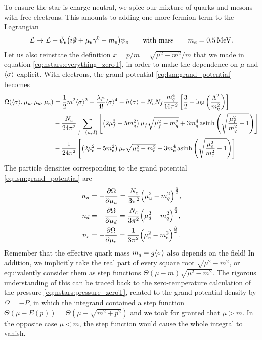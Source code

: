 To ensure the star is charge neutral, we spice our mixture of quarks and mesons with free electrons.
This amounts to adding one more fermion term to the Lagrangian
\begin{equation}
	\mathcal{L} \rightarrow \mathcal{L} + \bar{\psi}_e \big( i \slashed\partial + \mu_e \gamma^0 - m_e \big) \psi_e
	\qquad \text{with mass} \qquad
	m_e = \SI{0.5}{\mega\electronvolt}.
\end{equation}
Let us also reinstate the definition $x = p / m = \sqrt{\mu^2-m^2} / m$ that we made in equation \eqref{eq:nstars:everything_zeroT}, in order to make the dependence on $\mu$ and $\langle \sigma \rangle$ explicit.
With electrons, the grand potential \eqref{eq:lsm:grand_potential} becomes
\begin{equation}
\begin{split}
	\Omega(\langle \sigma \rangle,\mu_u,\mu_d,\mu_e) &= \frac12 m^2 \langle \sigma \rangle^2 + \frac{\lambda_P}{4!} \langle \sigma \rangle^4 - h \langle \sigma \rangle + N_c N_f \frac{m_q^4}{16 \pi^2} \left[ \frac{3}{2} + \log\left(\frac{{\Lambda}^2}{m_q^2}\right) \right] \\
	                                       &- \frac{N_c}{24 \pi^2} \sum_{f=\{u,d\}} \left[ \left( 2 \mu_f^2 - 5 m_q^2 \right) \mu_f \sqrt{\mu_f^2 - m_q^2} + 3 m_q^4 \operatorname{asinh} \left( \sqrt{\frac{\mu_{\smash{f}}^2}{m_q^2}-1} \right) \right] \\
	                                       &- \frac{  1}{24 \pi^2} \left[ \left( 2 \mu_e^2 - 5 m_e^2 \right) \mu_e \sqrt{\mu_e^2 - m_e^2} + 3 m_e^4 \operatorname{asinh} \left( \sqrt{\frac{\mu_e^2}{m_e^2}-1} \right) \right] .
\end{split}
\label{eq:lsm:grand_potential}
\end{equation}
The particle densities corresponding to the grand potential \eqref{eq:lsm:grand_potential} are
\begin{subequations}
\begin{align}
	n_u &= -\pdv{\Omega}{\mu_u} = \frac{N_c}{3 \pi^2} \Big( \mu_u^2 - m_q^2 \Big)^{\frac32}, \\
	n_d &= -\pdv{\Omega}{\mu_d} = \frac{N_c}{3 \pi^2} \Big( \mu_d^2 - m_q^2 \Big)^{\frac32}, \\
	n_e &= -\pdv{\Omega}{\mu_e} = \frac{  1}{3 \pi^2} \Big( \mu_e^2 - m_e^2 \Big)^{\frac32}.
\end{align}%
\label{eq:lsm:particle_densities}%
\end{subequations}%
Remember that the effective quark mass $m_q = g \langle \sigma \rangle$ also depends on the field!
In addition, we implicitly take the real part of every square root $\sqrt{\mu^2 - m^2}$, or equivalently consider them as step functions $\Theta(\mu-m) \sqrt{\mu^2 - m^2}$.
The rigorous understanding of this can be traced back to the zero-temperature calculation of the pressure \eqref{eq:nstars:pressure_zeroT}, related to the grand potential density by $\Omega = -P$, in which the integrand contained a step function $\Theta(\mu-E(p)) = \Theta(\mu-\sqrt{m^2+p^2})$ and we took for granted that $\mu > m$.
In the opposite case $\mu < m$, the step function would cause the whole integral to vanish.

